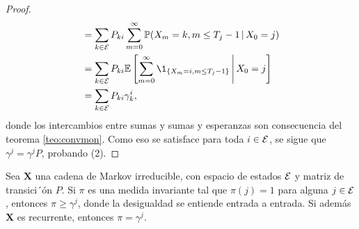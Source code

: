 \begin{proof}
\begin{align*}
        & = \sum_{k \in \Ee} P_{ki} \sum_{m = 0}^\infty \PP(X_m = k, m \leq T_j - 1 \,\vert\, X_0 = j) \\
        & = \sum_{k \in \Ee} P_{ki} \EE \left[\sum_{m = 0}^{\infty} \1_{\{X_m = i, m \leq T_j - 1\}} \,\Bigg\vert\, X_0 = j \right] \\%
        & = \sum_{k \in \Ee} P_{ki} \gamma_k^i,
    \end{align*}
    donde los intercambios entre sumas y sumas y esperanzas son consecuencia del teorema \ref{teo:convmon}. Como eso se satisface para toda $i \in \mathcal{E}$, se sigue que $\gamma^j = \gamma^j P$, probando (2).
\end{proof}

\begin{lemma} \label{lem:desigualdad gamma}
    Sea $\bm X$ una cadena de Markov irreducible, con espacio de estados $\mathcal{E}$ y matriz de transici´ón $P$. Si $\pi$ es una medida invariante tal que $\pi(j) = 1$ para alguna $j \in \mathcal{E}$, entonces $\pi \geq \gamma^j$, donde la desigualdad se entiende entrada a entrada. Si además $\bm X$ es recurrente, entonces $\pi = \gamma^j$.
\end{lemma}

